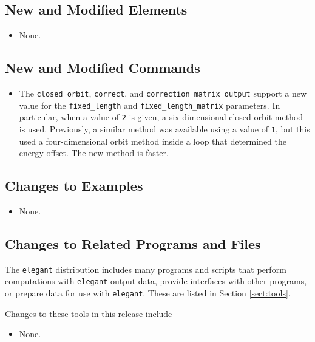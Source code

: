 \documentclass[11pt]{article}
\begin{document}
\subsection{New and Modified Elements}
\begin{itemize}
\item None.
\end{itemize}

\subsection{New and Modified Commands}
\begin{itemize}
\item The \verb|closed_orbit|, \verb|correct|, and \verb|correction_matrix_output| support a new value for the \verb|fixed_length| and
  \verb|fixed_length_matrix| parameters. In particular, when a value of \verb|2| is given, a six-dimensional closed orbit method is used.
  Previously, a similar method was available using a value of \verb|1|, but this used a four-dimensional orbit method inside a loop that
  determined the energy offset. The new method is faster.
\end{itemize}

\subsection{Changes to Examples}

\begin{itemize}
\item None.
\end{itemize}

\subsection{Changes to Related Programs and Files}

The {\tt elegant} distribution includes many programs and scripts that perform computations with {\tt elegant}
output data, provide interfaces with other programs, or prepare data for use with {\tt elegant}. These
are listed in Section \ref{sect:tools}. 

Changes to these tools in this release include
\begin{itemize}
\item None.
\end{itemize}
\end{document}

